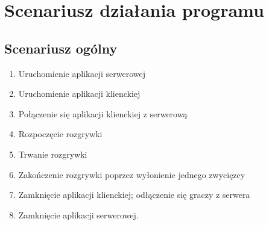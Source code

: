 \documentclass{article}
\begin{document}
\section{Scenariusz działania programu}
    \subsection{Scenariusz ogólny}
        \begin{enumerate}
            \item Uruchomienie aplikacji serwerowej
            \item Uruchomienie aplikacji klienckiej
            \item Połączenie się aplikacji klienckiej z serwerową
            \item Rozpoczęcie rozgrywki
            \item Trwanie rozgrywki
            \item Zakończenie rozgrywki poprzez wyłonienie jednego zwycięzcy
            \item Zamknięcie aplikacji klienckiej; odłączenie się graczy z serwera
            \item Zamknięcie aplikacji serwerowej.
        \end{enumerate}
    
\end{document}
